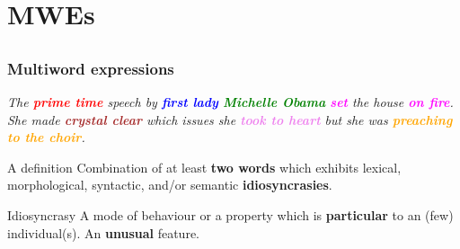 \documentclass[xcolor=dvipsnames]{beamer}
\begin{document}
\begin{frame}

\end{frame}


\section{MWEs} 
\subsection{}

\begin{frame}
  \frametitle{Multiword expressions}

\begin{block}{}
\textit{The \textcolor{red}{\textbf{prime time}} speech by \textcolor{blue}{\textbf{first lady}} \textcolor{green}{\textbf{Michelle Obama}} \textcolor{magenta}{\textbf{set}} the house \textcolor{magenta}{\textbf{on fire}}. She made \textcolor{brown}{\textbf{crystal clear}} which issues she \textcolor{violet}{\textbf{took to heart}} but she was \textcolor{orange}{\textbf{preaching to the choir}}.}
\end{block}

\pause

\begin{block}{A definition}%
Combination of at least \textbf{two words} which exhibits lexical, morphological, syntactic, and/or semantic \textbf{idiosyncrasies}.
\end{block}

\begin{block}{Idiosyncrasy}
A mode of behaviour or a property which is \textbf{particular} to an (few) individual(s). An \textbf{unusual} feature.
\end{block}


\end{frame}
\end{document}
